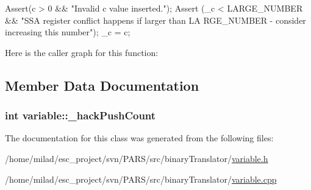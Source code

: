 \begin{DoxyCode}
                         {
        Assert(c > 0 && "Invalid c value inserted.");
    Assert (_c < LARGE_NUMBER && "SSA register conflict happens if larger than LA
      RGE_NUMBER - consider increasing this number");
        _c = c;
}
\end{DoxyCode}


Here is the caller graph for this function:




\subsection{Member Data Documentation}
\hypertarget{classvariable_a2d93d3b2fd7553f65c931b13aabe5504}{
\subsubsection[{\_\-hackPushCount}]{\setlength{\rightskip}{0pt plus 5cm}int {\bf variable::\_\-hackPushCount}}}
\label{classvariable_a2d93d3b2fd7553f65c931b13aabe5504}


The documentation for this class was generated from the following files:\begin{DoxyCompactItemize}
\item 
/home/milad/esc\_\-project/svn/PARS/src/binaryTranslator/\hyperlink{variable_8h}{variable.h}\item 
/home/milad/esc\_\-project/svn/PARS/src/binaryTranslator/\hyperlink{variable_8cpp}{variable.cpp}\end{DoxyCompactItemize}

